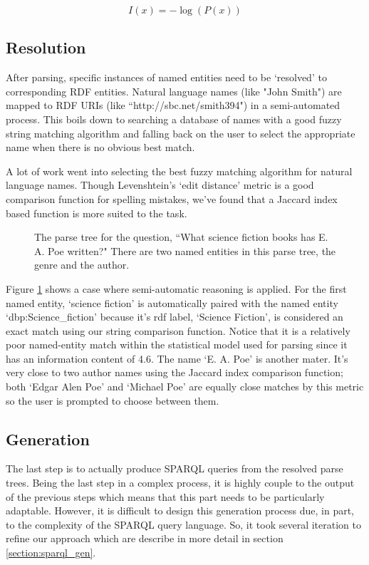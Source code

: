 \documentclass[11pt]{article}
\begin{document}
\[ I(x) = -\log(P(x)) \]

\subsection{Resolution}
\label{resolution}
After parsing, specific instances of named entities need to be `resolved' to
corresponding RDF entities. Natural language names (like "John Smith") are mapped
to RDF URIs (like ``http://sbc.net/smith394")
in a semi-automated process. This boils down to searching a
database of names with a good fuzzy string matching algorithm and falling
back on the user to select the appropriate name when there is no obvious best 
match.

A lot of work went into selecting the best fuzzy matching algorithm for
natural language names. Though Levenshtein's `edit distance' metric
is a good comparison function for spelling mistakes, we've found that
a Jaccard index based function is more suited to the task. 

\begin{figure}[h!]
\caption{The parse tree for the question, 
``What science fiction books has E. A. Poe written?"
There are two named entities in this parse tree, the genre and the author.}
\label{fig:resolve}
\end{figure}

Figure \ref{fig:resolve} shows a case where semi-automatic reasoning is applied.
For the first named entity, `science fiction' is automatically paired with the
named entity `dbp:Science\_fiction' because it's rdf label, `Science Fiction', is 
considered an exact match using our string comparison function. 
Notice that it is a relatively poor named-entity match within the statistical model
used for parsing since it has an information content of 4.6. 
The name `E. A. Poe' is another mater. It's
very close to two author names using the Jaccard index comparison function; both
`Edgar Alen Poe' and `Michael Poe' are equally close matches by this metric so the
user is prompted to choose between them.

\subsection{Generation}
\label{gen}
The last step is to actually produce SPARQL queries from the resolved parse trees.
Being the last step in a complex process, it is highly couple to the output of the
previous steps which means that this part needs to be particularly adaptable.
However, it is difficult to design this generation process due, in part, 
to the complexity of the SPARQL query language. 
So, it took several iteration to refine our approach which are describe
in more detail in section \ref{section:sparql_gen}.
\end{document}
